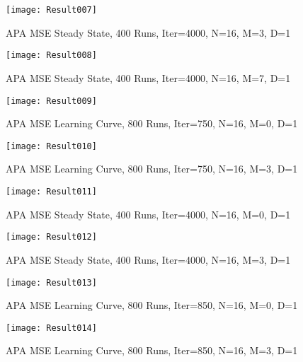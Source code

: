 \begin{figure}[htbp]
  \texttt{[image: Result007]}\\
  \caption{APA MSE Steady State, 400 Runs, Iter=4000, N=16, M=3, D=1}\label{APAMSE007}
\end{figure}

\begin{figure}[htbp]
  \texttt{[image: Result008]}\\
  \caption{APA MSE Steady State, 400 Runs, Iter=4000, N=16, M=7, D=1}\label{APAMSE008}
\end{figure}

\begin{figure}[htbp]
  \texttt{[image: Result009]}\\
  \caption{APA MSE Learning Curve, 800 Runs, Iter=750, N=16, M=0, D=1}\label{APAMSE009}
\end{figure}

\begin{figure}[htbp]
  \texttt{[image: Result010]}\\
  \caption{APA MSE Learning Curve, 800 Runs, Iter=750, N=16, M=3, D=1}\label{APAMSE010}
\end{figure}

\begin{figure}[htbp]
  \texttt{[image: Result011]}\\
  \caption{APA MSE Steady State, 400 Runs, Iter=4000, N=16, M=0, D=1}\label{APAMSE011}
\end{figure}

\begin{figure}[htbp]
  \texttt{[image: Result012]}\\
  \caption{APA MSE Steady State, 400 Runs, Iter=4000, N=16, M=3, D=1}\label{APAMSE012}
\end{figure}

\begin{figure}[htbp]
  \texttt{[image: Result013]}\\
  \caption{APA MSE Learning Curve, 800 Runs, Iter=850, N=16, M=0, D=1}\label{APAMSE013}
\end{figure}

\begin{figure}[htbp]
  \texttt{[image: Result014]}\\
  \caption{APA MSE Learning Curve, 800 Runs, Iter=850, N=16, M=3, D=1}\label{APAMSE014}
\end{figure}

